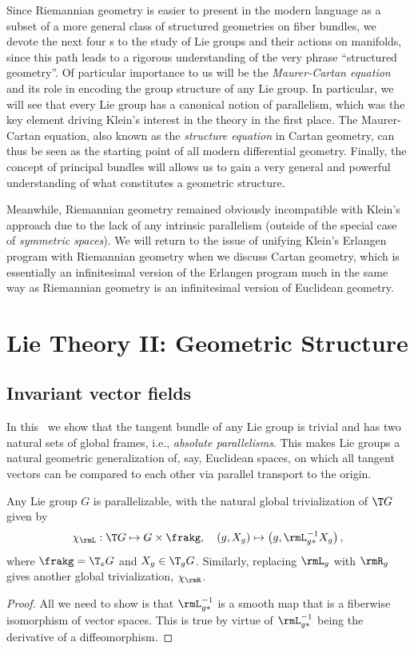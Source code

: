 \begin{hrem*}
    Since Riemannian geometry is easier to present in the modern language as a subset of a more general class of structured geometries on fiber bundles, we devote the next four \chap s to the study of Lie groups and their actions on manifolds, since this path leads to a rigorous understanding of the very phrase ``structured geometry''. Of particular importance to us will be the \emph{Maurer-Cartan equation} and its role in encoding the group structure of any Lie group. In particular, we will see that every Lie group has a canonical notion of parallelism, which was the key element driving Klein's interest in the theory in the first place. The Maurer-Cartan equation, also known as the \emph{structure equation} in Cartan geometry, can thus be seen as the starting point of all modern differential geometry. Finally, the concept of principal bundles will allows us to gain a very general and powerful understanding of what constitutes a geometric structure.
    
    Meanwhile, Riemannian geometry remained obviously incompatible with Klein's approach due to the lack of any intrinsic parallelism (outside of the special case of \emph{symmetric spaces}). We will return to the issue of unifying Klein's Erlangen program with Riemannian geometry when we discuss Cartan geometry, which is essentially an infinitesimal version of the Erlangen program much in the same way as Riemannian geometry is an infinitesimal version of Euclidean geometry.
\end{hrem*}





\chapter{Lie Theory II: Geometric Structure}\label{chap: Lie theory ii}

\section{Invariant vector fields}

In this \sect\ we show that the tangent bundle of any Lie group is trivial and has two natural sets of global frames, i.e., \emph{absolute parallelisms}. This makes Lie groups a natural geometric generalization of, say, Euclidean spaces, on which all tangent vectors can be compared to each other via parallel transport to the origin.

\begin{prop}
    Any Lie group $G$ is parallelizable, with the natural global trivialization of $\T G$ given by
    \[\chi_\rmL:\T G\mapsto G\times \frakg,\quad (g,X_g)\mapsto \left(g, \rmL_{g\ast }^{-1}X_g\right),\]
    where $\frakg=\T_e G$ and $X_g\in \T_gG$. Similarly, replacing $\rmL_g$ with $\rmR_g$ gives another global trivialization, $\chi_\rmR$.
\end{prop}
\begin{proof}
    All we need to show is that $\rmL_{g\ast}^{-1}$ is a smooth map that is a fiberwise isomorphism of vector spaces. This is true by virtue of $\rmL_{g\ast}^{-1}$ being the derivative of a diffeomorphism.
\end{proof}

